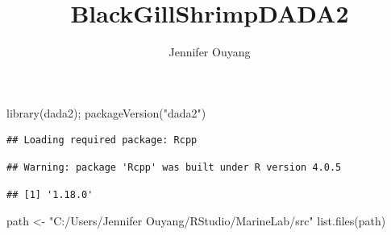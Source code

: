 \documentclass[
]{article}
\title{BlackGillShrimpDADA2}
\author{Jennifer Ouyang}
\date{}
\newenvironment{Shaded}{\begin{snugshade}}{\end{snugshade}}
\newcommand{\FunctionTok}[1]{\textcolor[rgb]{0.00,0.00,0.00}{#1}}
\newcommand{\NormalTok}[1]{#1}
\newcommand{\OtherTok}[1]{\textcolor[rgb]{0.56,0.35,0.01}{#1}}
\newcommand{\StringTok}[1]{\textcolor[rgb]{0.31,0.60,0.02}{#1}}
\begin{document}
\maketitle

\begin{Shaded}
\begin{Highlighting}[]
\FunctionTok{library}\NormalTok{(dada2); }\FunctionTok{packageVersion}\NormalTok{(}\StringTok{"dada2"}\NormalTok{)}
\end{Highlighting}
\end{Shaded}

\begin{verbatim}
## Loading required package: Rcpp
\end{verbatim}

\begin{verbatim}
## Warning: package 'Rcpp' was built under R version 4.0.5
\end{verbatim}

\begin{verbatim}
## [1] '1.18.0'
\end{verbatim}

\begin{Shaded}
\begin{Highlighting}[]
\NormalTok{path }\OtherTok{\textless{}{-}} \StringTok{"C:/Users/Jennifer Ouyang/RStudio/MarineLab/src"}
\FunctionTok{list.files}\NormalTok{(path)}
\end{Highlighting}
\end{Shaded}
\end{document}
